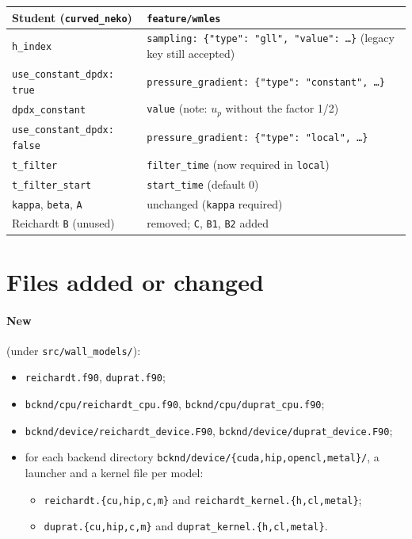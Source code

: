 \documentclass[11pt,a4paper]{article}
\newcommand{\code}[1]{\texttt{#1}}
\newcommand{\up}{u_p}
\begin{document}
\begin{center}
\small
\begin{tabularx}{\textwidth}{@{}l>{\raggedright\arraybackslash}X@{}}
\toprule
Student (\code{curved\_neko}) & \code{feature/wmles} \\
\midrule
\code{h\_index} & \code{sampling: \{"type": "gll", "value": \ldots\}} (legacy key still accepted) \\
\code{use\_constant\_dpdx: true} & \code{pressure\_gradient: \{"type": "constant", \ldots\}} \\
\code{dpdx\_constant} & \code{value} (note: $\up$ without the factor 1/2) \\
\code{use\_constant\_dpdx: false} & \code{pressure\_gradient: \{"type": "local", \ldots\}} \\
\code{t\_filter} & \code{filter\_time} (now required in \code{local}) \\
\code{t\_filter\_start} & \code{start\_time} (default 0) \\
\code{kappa}, \code{beta}, \code{A} & unchanged (\code{kappa} required) \\
Reichardt \code{B} (unused) & removed; \code{C}, \code{B1}, \code{B2} added \\
\bottomrule
\end{tabularx}
\end{center}

\section{Files added or changed}
\label{app:files}

\paragraph{New} (under \code{src/wall\_models/}):
\begin{itemize}
  \item \code{reichardt.f90}, \code{duprat.f90};
  \item \code{bcknd/cpu/reichardt\_cpu.f90}, \code{bcknd/cpu/duprat\_cpu.f90};
  \item \code{bcknd/device/reichardt\_device.F90},
    \code{bcknd/device/duprat\_device.F90};
  \item for each backend directory \code{bcknd/device/\{cuda,hip,opencl,metal\}/},
    a launcher and a kernel file per model:
    \begin{itemize}
      \item \code{reichardt.\{cu,hip,c,m\}} and
        \code{reichardt\_kernel.\{h,cl,metal\}};
      \item \code{duprat.\{cu,hip,c,m\}} and
        \code{duprat\_kernel.\{h,cl,metal\}}.
    \end{itemize}
\end{itemize}
\end{document}

